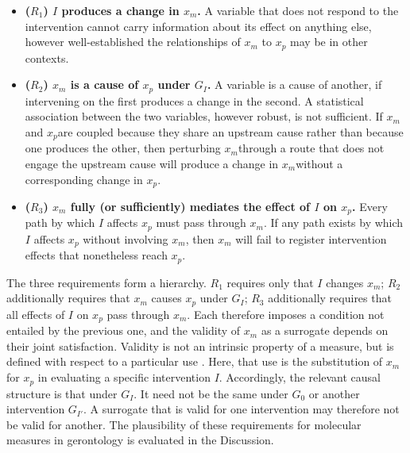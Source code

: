 \documentclass[twocolumn]{article} %
\begin{document}
\begin{itemize}
	\item[-] \textbf{($R_1$) $I$ produces a change in $x_m$.} A variable that does not respond to the intervention cannot carry information about its effect on anything else, however well-established the relationships of $x_m$ to $x_p$ may be in other contexts.
	
	\item[-] \textbf{($R_2$) $x_m$ is a cause of  $x_p$ under $G_I$.} A variable is a cause of another, if intervening on the first produces a change in the second. A statistical association between the two variables, however robust, is not sufficient. If $x_m$​ and $x_p$​ are coupled because they share an upstream cause rather than because one produces the other, then perturbing $x_m$​ through a route that does not engage the upstream cause will produce a change in $x_m$​ without a corresponding change in $x_p$​.
	
	\item[-] \textbf{($R_3$) $x_m$ fully (or sufficiently) mediates the effect of $I$ on $x_p$.} Every path by which $I$ affects $x_p$ must pass through $x_m$. If any path exists by which $I$ affects $x_p$ without involving $x_m$, then $x_m$ will fail to register intervention effects that nonetheless reach $x_p$.
	
\end{itemize}

The three requirements form a hierarchy. $R_1$ requires only that $I$ changes $x_m$; $R_2$ additionally requires that $x_m$ causes $x_p$ under $G_I$; $R_3$ additionally requires that all effects of $I$ on $x_p$ pass through $x_m$. Each therefore imposes a condition not entailed by the previous one, and the validity of $x_m$ as a surrogate depends on their joint satisfaction. Validity is not an intrinsic property of a measure, but is defined with respect to a particular use \cite{hu2025house, hu2024apples}. Here, that use is the substitution of $x_m$ for $x_p$ in evaluating a specific intervention $I$. Accordingly, the relevant causal structure is that under $G_I$. It need not be the same under $G_0$ or another intervention $G_{I'}$. A surrogate that is valid for one intervention may therefore not be valid for another. The plausibility of these requirements for molecular measures in gerontology is evaluated in the Discussion.
\end{document}
